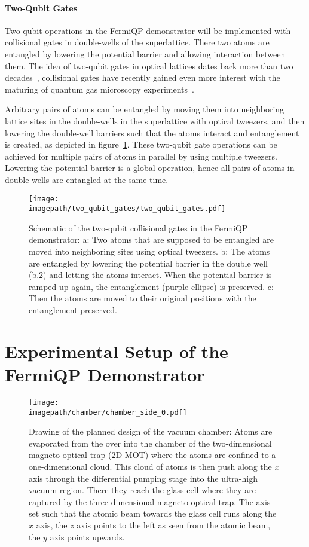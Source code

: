 \paragraph*{Two-Qubit Gates}
Two-qubit operations in the FermiQP demonstrator will be implemented with collisional gates in double-wells of the superlattice. There two atoms are entangled by lowering the potential barrier and allowing interaction between them. The idea of two-qubit gates in optical lattices dates back more than two decades~\cite{jaksch_fast_2000, anderlini_controlled_2006,trotzky_time-resolved_2008,trotzky_controlling_2010}, collisional gates have recently gained even more interest with the maturing of quantum gas microscopy experiments~\cite{dai_generation_2016, yang_cooling_2020, zhang_functional_2022}.

Arbitrary pairs of atoms can be entangled by moving them into neighboring lattice sites in the double-wells in the superlattice with optical tweezers, and then lowering the double-well barriers such that the atoms interact and entanglement is created, as depicted in figure~\ref{fig:two_qubit_gates}. These two-qubit gate operations can be achieved for multiple pairs of atoms in parallel by using multiple tweezers. Lowering the potential barrier is a global operation, hence all pairs of atoms in double-wells are entangled at the same time.

\begin{figure}
    \centering
    \texttt{[image: \\imagepath/two\_qubit\_gates/two\_qubit\_gates.pdf]}
    \caption{Schematic of the two-qubit collisional gates in the FermiQP demonstrator: a: Two atoms that are supposed to be entangled are moved into neighboring sites using optical tweezers. b: The atoms are entangled by lowering the potential barrier in the double well (b.2) and letting the atoms interact. When the potential barrier is ramped up again, the entanglement (purple ellipse) is preserved. c: Then the atoms are moved to their original positions with the entanglement preserved.}
    \label{fig:two_qubit_gates}
\end{figure}



\section{Experimental Setup of the FermiQP Demonstrator}
\begin{figure}
    \centering
    \texttt{[image: \\imagepath/chamber/chamber\_side\_0.pdf]}
    \caption{Drawing of the planned design of the vacuum chamber: Atoms are evaporated from the over into the chamber of the two-dimensional magneto-optical trap (2D MOT) where the atoms are confined to a one-dimensional cloud. This cloud of atoms is then push along the $x$ axis through the differential pumping stage into the ultra-high vacuum region. There they reach the glass cell where they are captured by the three-dimensional magneto-optical trap. The axis set such that the atomic beam towards the glass cell runs along the $x$ axis, the $z$ axis points to the left as seen from the atomic beam, the $y$ axis points upwards.}
    \label{fig:chamber}
\end{figure}

